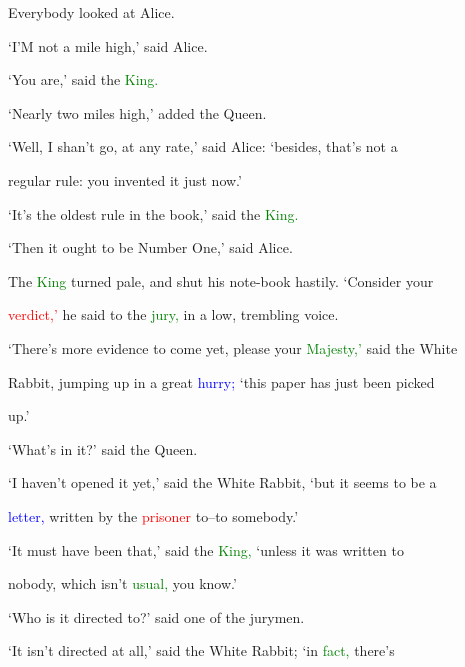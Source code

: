  Everybody looked at Alice.



 ‘I’M not a mile high,’ said Alice.



 ‘You are,’ said the \textcolor{green}{King.}



 ‘Nearly two miles high,’ added the Queen.



 ‘Well, I shan’t go, at any rate,’ said Alice: ‘besides, that’s not a

 regular \textcolor{BurntOrange}{rule:} you invented it just now.’



 ‘It’s the oldest \textcolor{BurntOrange}{rule} in the book,’ said the \textcolor{green}{King.}



 ‘Then it ought to be Number One,’ said Alice.



 The \textcolor{green}{King} turned pale, and shut his note-book hastily. ‘Consider your

 \textcolor{red}{verdict,’} he said to the \textcolor{green}{jury,} in a low, trembling voice.



 ‘There’s more evidence to come yet, please your \textcolor{green}{Majesty,’} said the \textcolor{BurntOrange}{White}

 Rabbit, jumping up in a great \textcolor{blue}{hurry;} ‘this paper has just been picked

 up.’



 ‘What’s in it?’ said the Queen.



 ‘I haven’t opened it yet,’ said the \textcolor{BurntOrange}{White} Rabbit, ‘but it seems to be a

 \textcolor{blue}{letter,} written by the \textcolor{red}{prisoner} to--to somebody.’



 ‘It must have been that,’ said the \textcolor{green}{King,} ‘unless it was written to

 nobody, which isn’t \textcolor{green}{usual,} you know.’



 ‘Who is it directed to?’ said one of the jurymen.



 ‘It isn’t directed at all,’ said the \textcolor{BurntOrange}{White} Rabbit; ‘in \textcolor{green}{fact,} there’s

